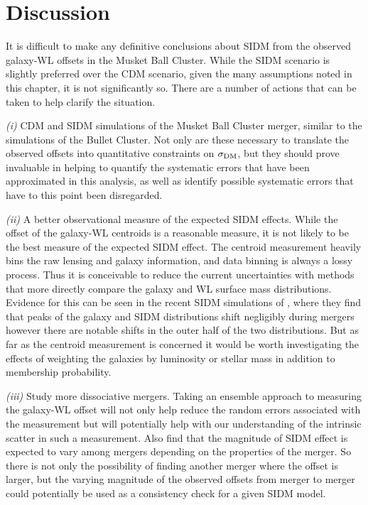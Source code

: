 \section{Discussion}

It is difficult to make any definitive conclusions about SIDM from the observed galaxy-WL offsets in the Musket Ball Cluster.
While the SIDM scenario is slightly preferred over the CDM scenario, given the many assumptions noted in this chapter, it is not significantly so.
There are a number of actions that can be taken to help clarify the situation.

\textit{(i)} CDM and SIDM simulations of the Musket Ball Cluster merger, similar to the \citet{Randall:2008hs} simulations of the Bullet Cluster.
Not only are these necessary to translate the observed offsets into quantitative constraints on $\sigma_{\rm DM}$, but they should prove invaluable in helping to quantify the systematic errors that have been approximated in this analysis, as well as identify possible systematic errors that have to this point been disregarded.

\textit{(ii)} A better observational measure of the expected SIDM effects.
While the offset of the galaxy-WL centroids is a reasonable measure, it is not likely to be the best measure of the expected SIDM effect.
The centroid measurement heavily bins the raw lensing and galaxy information, and data binning is always a lossy process.
Thus it is conceivable to reduce the current uncertainties with methods that more directly compare the galaxy and WL surface mass distributions.
Evidence for this can be seen in the recent SIDM simulations of \citet{Kahlhoefer:2013wp}, where they find that peaks of the galaxy and SIDM distributions shift  negligibly during mergers however there are notable shifts in the outer half of the  two distributions.
But as far as the centroid measurement is concerned it would be worth investigating the effects of weighting the galaxies by luminosity or stellar mass in addition to membership probability.

\textit{(iii)} Study more dissociative mergers.
Taking an ensemble approach to measuring the galaxy-WL offset will not only help reduce the random errors associated with the measurement but will potentially help with our understanding of the intrinsic scatter in such a measurement.
Also \citet{Kahlhoefer:2013wp} find that the magnitude of SIDM effect is expected to vary among mergers depending on the properties of the merger.
So there is not only the possibility of finding another merger where the offset is larger, but the varying magnitude of the observed offsets from merger to merger could potentially be used as a consistency check for a given SIDM model.

